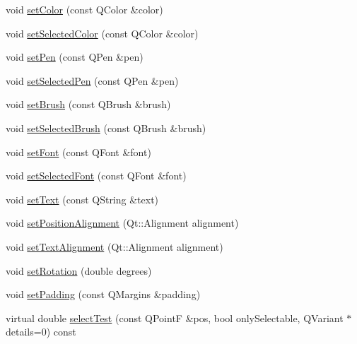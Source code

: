\begin{DoxyCompactItemize}
\item 
void \hyperlink{classQCPItemText_aa51efc0841fe52da9eaf8aff6fc8a8b2}{set\+Color} (const Q\+Color \&color)
\item 
void \hyperlink{classQCPItemText_ae7ba0bdb75c897b028388e45bfd435fa}{set\+Selected\+Color} (const Q\+Color \&color)
\item 
void \hyperlink{classQCPItemText_a9b9ec6eea0eb0603977ff84d4c78d0a3}{set\+Pen} (const Q\+Pen \&pen)
\item 
void \hyperlink{classQCPItemText_a291febe586f0da3f1c392e77bef4aa20}{set\+Selected\+Pen} (const Q\+Pen \&pen)
\item 
void \hyperlink{classQCPItemText_a1c7e131516df2ed8d941ef31240ded8e}{set\+Brush} (const Q\+Brush \&brush)
\item 
void \hyperlink{classQCPItemText_a6b8377eeb2af75eb9528422671ac16cb}{set\+Selected\+Brush} (const Q\+Brush \&brush)
\item 
void \hyperlink{classQCPItemText_a94ad60ebe04f5c07c35e7c2029e96b1f}{set\+Font} (const Q\+Font \&font)
\item 
void \hyperlink{classQCPItemText_a0be2841772f83663c4db307928b82816}{set\+Selected\+Font} (const Q\+Font \&font)
\item 
void \hyperlink{classQCPItemText_a3dacdda0ac88f99a05b333b977c48747}{set\+Text} (const Q\+String \&text)
\item 
void \hyperlink{classQCPItemText_a781cdf8c640fc6a055dcff1e675c8c7a}{set\+Position\+Alignment} (Qt\+::\+Alignment alignment)
\item 
void \hyperlink{classQCPItemText_ab5bc0684c4d1bed81949a11b34dba478}{set\+Text\+Alignment} (Qt\+::\+Alignment alignment)
\item 
void \hyperlink{classQCPItemText_a4bcc10cd97952c3f749d75824b5077f0}{set\+Rotation} (double degrees)
\item 
void \hyperlink{classQCPItemText_aeea8a3e01f135f9dd0bb08f51db66310}{set\+Padding} (const Q\+Margins \&padding)
\item 
virtual double \hyperlink{classQCPItemText_a285b95bb6634c2e4f7768abb7a8bc69c}{select\+Test} (const Q\+PointF \&pos, bool only\+Selectable, Q\+Variant $\ast$details=0) const 
\end{DoxyCompactItemize}
